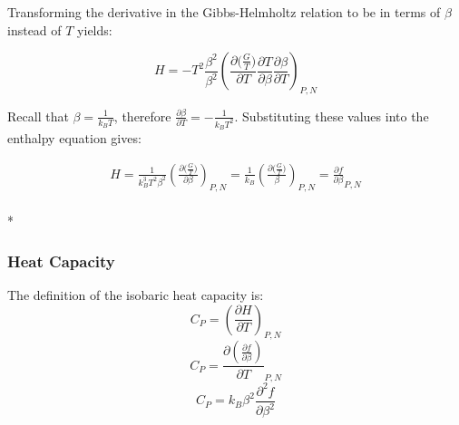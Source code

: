 \documentclass[aps,pre,nofootinbib,superscriptaddress,linenumbers,10pt, draft,tightenlines]{revtex4-1}
\begin{document}
\begin{itemize}
\begin{itemize}
    	Transforming the derivative in the Gibbs-Helmholtz relation to be in terms of $\beta$ instead of $T$ yields:
    	
    	\begin{equation}H=-T^2  \frac{\beta^2}{\beta^2}\left(\frac{\partial \big(\frac{G}{T}\big)}{\partial T} \frac{\partial T}{\partial \beta} \frac{\partial \beta}{\partial T}\right)_{P,N}\end{equation}
    	
    	
    	Recall that $\beta = \frac{1}{k_B T}$, therefore $\frac{\partial \beta}{\partial T} = - \frac{1}{k_B T^2}$. Substituting these values into the enthalpy equation gives:
    	
    	\begin{multline}
    	H = \frac{1}{k_B^3 T^2 \beta^2} \left(\frac{\partial \big(\frac{G}{T}\big)}{\partial \beta}\right)_{P,N}  = \frac{1}{k_B} \left(\frac{\partial \big(\frac{G}{T}\big)}{\beta}\right)_{P,N} = \frac{\partial f}{\partial \beta}_{P,N} 
    	\end{multline}\\*
    	
    	
    	
    	\subsubsection{Heat Capacity}
    	The definition of the isobaric heat capacity is:
    	\begin{equation}C_P = \left( \frac{\partial H}{\partial T}\right)_{P,N}\end{equation}
    	\begin{equation}C_P =  \frac{\partial \left(\frac{\partial f}{\partial \beta}\right)}{\partial T}_{P,N}\end{equation}
    	\begin{equation}C_P = k_B \beta^2 \frac{\partial^2 f}{\partial \beta^2}\end{equation}
    	

\end{itemize}
\end{itemize}
\end{document}
